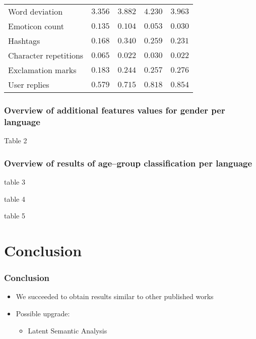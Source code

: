 \documentclass[utf8]{beamer}
\begin{document}
\begin{frame}
{\begin{table}
\begin{center}
\begin{tabular}{l|rrrr}
			Word deviation  & $ 3.356 $ & $ 3.882 $ & $ 4.230 $ & $ 3.963 $ \\
			Emoticon count  & $ 0.135 $ & $ 0.104 $ & $ 0.053 $ & $ 0.030 $ \\
			Hashtags  & $ 0.168 $ & $ 0.340 $ & $ 0.259 $ & $ 0.231 $ \\
			Character repetitions  & $ 0.065 $ & $ 0.022 $ & $ 0.030 $ & $ 0.022 $ \\
			Exclamation marks & $ 0.183 $ & $ 0.244 $ & $ 0.257 $ & $ 0.276 $ \\
			User replies & $ 0.579 $ & $ 0.715 $ & $ 0.818 $ & $ 0.854 $ \\
			\bottomrule
			\end{tabular}
			\end{center}
		\end{table}
	}
\end{frame}

\begin{frame}
	\frametitle{Overview of additional features values for gender per language}
	Table 2
\end{frame}

\begin{frame}
	\frametitle{Overview of results of age–group classification per language}
	table 3	
\end{frame}


\begin{frame}
	table 4	
\end{frame}

\begin{frame}
	table 5	
\end{frame}
\section{Conclusion}
\frame{\tableofcontents[currentsection]}


\begin{frame}
	\frametitle{Conclusion}
	\begin{itemize}
		\item We succeeded to obtain results similar to other published works
		\item Possible upgrade:
		\begin{itemize}
			\item Latent Semantic Analysis
		\end{itemize}
	\end{itemize}
\end{frame}
\end{document}
